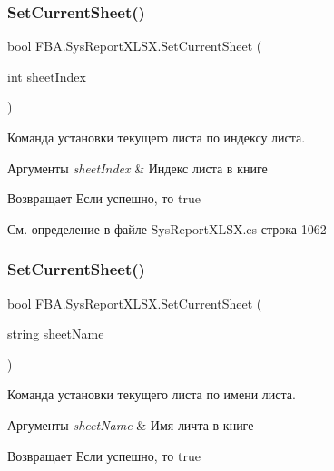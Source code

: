 \subsubsection{\texorpdfstring{Set\+Current\+Sheet()}{SetCurrentSheet()}\hspace{0.1cm}{\footnotesize\ttfamily [1/2]}}
{\footnotesize\ttfamily bool F\+B\+A.\+Sys\+Report\+X\+L\+S\+X.\+Set\+Current\+Sheet (\begin{DoxyParamCaption}\item[{int}]{sheet\+Index }\end{DoxyParamCaption})}



Команда установки текущего листа по индексу листа. 


\begin{DoxyParams}{Аргументы}
{\em sheet\+Index} & Индекс листа в книге\\
\hline
\end{DoxyParams}
\begin{DoxyReturn}{Возвращает}
Если успешно, то true
\end{DoxyReturn}


См. определение в файле Sys\+Report\+X\+L\+S\+X.\+cs строка 1062

\mbox{\label{class_f_b_a_1_1_sys_report_x_l_s_x_a9fd512550b6846ba0ed7556745ed2523}} 
\subsubsection{\texorpdfstring{Set\+Current\+Sheet()}{SetCurrentSheet()}\hspace{0.1cm}{\footnotesize\ttfamily [2/2]}}
{\footnotesize\ttfamily bool F\+B\+A.\+Sys\+Report\+X\+L\+S\+X.\+Set\+Current\+Sheet (\begin{DoxyParamCaption}\item[{string}]{sheet\+Name }\end{DoxyParamCaption})}



Команда установки текущего листа по имени листа. 


\begin{DoxyParams}{Аргументы}
{\em sheet\+Name} & Имя личта в книге\\
\hline
\end{DoxyParams}
\begin{DoxyReturn}{Возвращает}
Если успешно, то true
\end{DoxyReturn}


